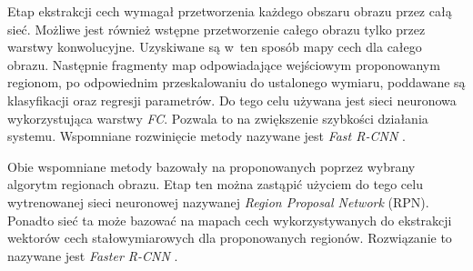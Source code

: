Etap ekstrakcji cech wymagał przetworzenia każdego obszaru obrazu przez całą sieć.
Możliwe jest również wstępne przetworzenie całego obrazu tylko przez warstwy konwolucyjne.
Uzyskiwane są w~ten sposób mapy cech dla całego obrazu.
Następnie fragmenty map odpowiadające wejściowym proponowanym regionom, po odpowiednim przeskalowaniu do ustalonego wymiaru, poddawane są klasyfikacji oraz regresji parametrów.
Do tego celu używana jest sieci neuronowa wykorzystująca warstwy \emph{FC}.
Pozwala to na zwiększenie szybkości działania systemu.
Wspomniane rozwinięcie metody nazywane jest \emph{Fast R-CNN} \cite{fast_rcnn}.

Obie wspomniane metody bazowały na proponowanych poprzez wybrany algorytm regionach obrazu.
Etap ten można zastąpić użyciem do tego celu wytrenowanej sieci neuronowej nazywanej \emph{Region Proposal Network} (RPN).
Ponadto sieć ta może bazować na mapach cech wykorzystywanych do ekstrakcji wektorów cech stałowymiarowych  dla proponowanych regionów. 
Rozwiązanie to nazywane jest \emph{Faster R-CNN} \cite{faster_rcnn}.
